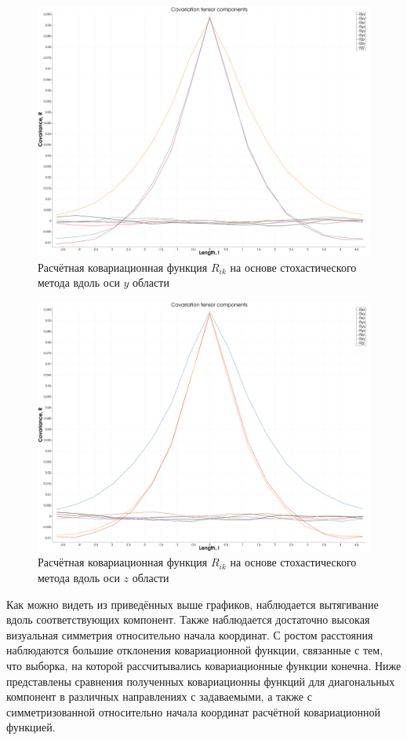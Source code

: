 \begin{figure}[ht] 
  \center
  \includegraphics [width=0.8\linewidth] {images/kriging/3components/calculated_all_y.png}
  \caption{Расчётная ковариационная функция $R_{ik}$ на основе стохастического метода вдоль оси $y$ области } 
  \label{img:kriging_covariances_diag}  
\end{figure}

\begin{figure}[ht] 
  \center
  \includegraphics [width=0.8\linewidth] {images/kriging/3components/calculated_all_z.png}
  \caption{Расчётная ковариационная функция $R_{ik}$ на основе стохастического метода вдоль оси $z$ области } 
  \label{img:kriging_covariances_diag}  
\end{figure}

Как можно видеть из приведённых выше графиков, наблюдается вытягивание вдоль соответствующих компонент. Также наблюдается достаточно высокая визуальная симметрия относительно начала координат. С ростом расстояния наблюдаются большие отклонения ковариационной функции, связанные с тем, что выборка, на которой рассчитывались ковариационные функции конечна. Ниже представлены сравнения полученных ковариационны функций для диагональных компонент в различных направлениях с задаваемыми, а также с симметризованной относительно начала координат расчётной ковариационной функцией.


